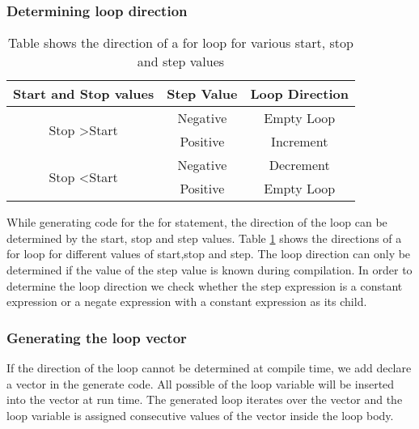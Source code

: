 \subsubsection{Determining loop direction}
\begin{table}[htbp]
\centering
\begin{tabular}{|c|c|c|}
\hline
Start and Stop values & Step Value & Loop Direction \\ \hline
\multirow{2}{*}{Stop  \textgreater  Start} & Negative & Empty Loop \\ \cline{2-3} 
 & Positive & Increment \\ \hline
\multirow{2}{*}{Stop \textless Start} & Negative & Decrement \\ \cline{2-3} 
 & Positive & Empty Loop \\ \hline
\end{tabular}
\caption[Loop Direction]{Table shows the direction of a for loop for various start, stop and step values}
\label{tab:loopDirection}
\end{table}
While generating code for the for statement, the direction of the loop can be determined by the start, stop and step values. Table \ref{tab:loopDirection} shows the directions of a for loop for different values of start,stop and step. The loop direction can only be determined if the value of the step value is known during compilation. In order to determine the loop direction we check whether the step expression is  a constant expression or a negate expression with a constant expression as its child.
\subsubsection{ Generating the loop vector}
If the direction of the loop cannot be determined at compile time, we add declare a vector in the generate code. All possible of the loop variable will be inserted into the vector at run time. The generated loop iterates over the vector and the loop variable is assigned consecutive values of the vector inside the loop body. 
